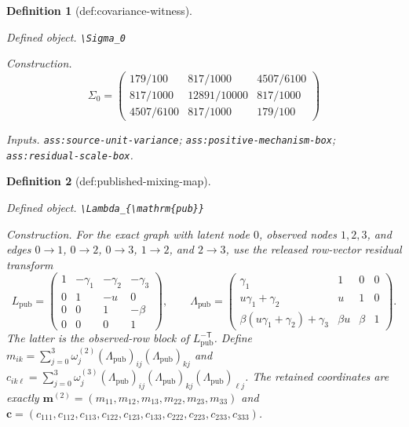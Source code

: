 \documentclass{article}
\newtheorem{definition}{Definition}
\begin{document}
\begin{definition}[def:covariance-witness]\label{def:covariance-witness}
\par\smallskip\noindent\emph{Defined object.} \texttt{\textbackslash{}\allowbreak{}Sigma\_\allowbreak{}0}
\par\smallskip\noindent\emph{Construction.} \[\Sigma_0=\begin{pmatrix}179/100&817/1000&4507/6100\\817/1000&12891/10000&817/1000\\4507/6100&817/1000&179/100\end{pmatrix}\]
\par\smallskip\noindent\emph{Inputs.} \texttt{ass:\allowbreak{}source-\allowbreak{}unit-\allowbreak{}variance}; \texttt{ass:\allowbreak{}positive-\allowbreak{}mechanism-\allowbreak{}box}; \texttt{ass:\allowbreak{}residual-\allowbreak{}scale-\allowbreak{}box}.
\end{definition}

\begin{definition}[def:published-mixing-map]\label{def:published-mixing-map}
\par\smallskip\noindent\emph{Defined object.} \texttt{\textbackslash{}\allowbreak{}Lambda\_\allowbreak{}\{\textbackslash{}\allowbreak{}mathrm\{pub\}\allowbreak{}\}\allowbreak{}}
\par\smallskip\noindent\emph{Construction.} For the exact graph with latent node \(0\), observed nodes \(1,2,3\), and edges \(0\to1\), \(0\to2\), \(0\to3\), \(1\to2\), and \(2\to3\), use the released row-vector residual transform \[L_{\mathrm{pub}}=\begin{pmatrix}1&-\gamma_1&-\gamma_2&-\gamma_3\\0&1&-u&0\\0&0&1&-\beta\\0&0&0&1\end{pmatrix},\qquad \Lambda_{\mathrm{pub}}=\begin{pmatrix}\gamma_1&1&0&0\\u\gamma_1+\gamma_2&u&1&0\\\beta(u\gamma_1+\gamma_2)+\gamma_3&\beta u&\beta&1\end{pmatrix}.\] The latter is the observed-row block of \(L_{\mathrm{pub}}^{-\mathsf T}\). Define \(m_{ik}=\sum_{j=0}^3\omega_j^{(2)}(\Lambda_{\mathrm{pub}})_{ij}(\Lambda_{\mathrm{pub}})_{kj}\) and \(c_{ik\ell}=\sum_{j=0}^3\omega_j^{(3)}(\Lambda_{\mathrm{pub}})_{ij}(\Lambda_{\mathrm{pub}})_{kj}(\Lambda_{\mathrm{pub}})_{\ell j}\). The retained coordinates are exactly \(\mathbf m^{(2)}=(m_{11},m_{12},m_{13},m_{22},m_{23},m_{33})\) and \(\mathbf c=(c_{111},c_{112},c_{113},c_{122},c_{123},c_{133},c_{222},c_{223},c_{233},c_{333})\).
\end{definition}
\end{document}

